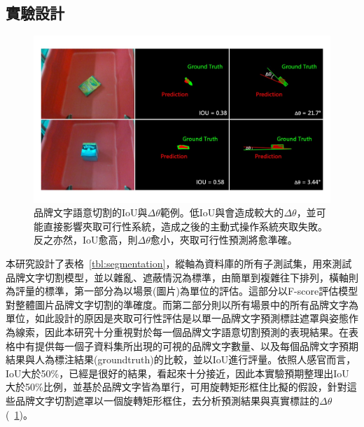 \subsection{實驗設計}

\begin{figure}[ht]
	\centering
	\includegraphics[height=!, width=1.0\linewidth, keepaspectratio=true]
	{./figures/iou_deltatheta.jpg}
  \caption{品牌文字語意切割的IoU與$\Delta\theta$範例。低IoU與會造成較大的$\Delta\theta$，並可能直接影響夾取可行性系統，造成之後的主動式操作系統夾取失敗。反之亦然，IoU愈高，則$\Delta\theta$愈小，夾取可行性預測將愈準確。}
  \label{figure:iou_deltatheta}
\end{figure}

本研究設計了表格~\ref{tbl:segmentation}，縱軸為資料庫的所有子測試集，用來測試品牌文字切割模型，並以雜亂、遮蔽情況為標準，由簡單到複雜往下排列，橫軸則為評量的標準，第一部分為以場景(圖片)為單位的評估。這部分以F-score評估模型對整體圖片品牌文字切割的準確度。而第二部分則以所有場景中的所有品牌文字為單位，如此設計的原因是夾取可行性評估是以單一品牌文字預測標註遮罩與姿態作為線索，因此本研究十分重視對於每一個品牌文字語意切割預測的表現結果。在表格中有提供每一個子資料集所出現的可視的品牌文字數量、以及每個品牌文字預期結果與人為標注結果(groundtruth)的比較，並以IoU進行評量。依照人感官而言，IoU大於50\%，已經是很好的結果，看起來十分接近，因此本實驗預期整理出IoU大於50\%比例，並基於品牌文字皆為單行，可用旋轉矩形框住比擬的假設，針對這些品牌文字切割遮罩以一個旋轉矩形框住，去分析預測結果與真實標註的$\Delta\theta$(~\ref{figure:iou_deltatheta})。

